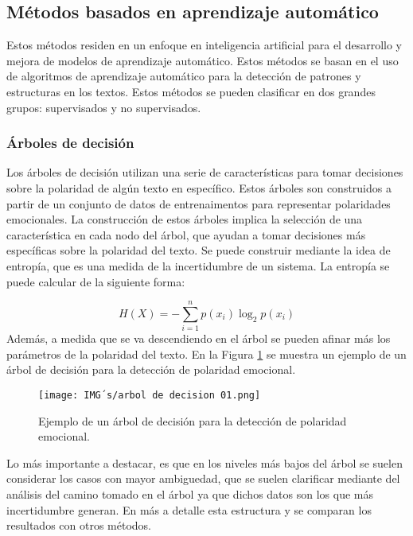 \documentclass[12pt, conference]{IEEEtran}
\begin{document}
\subsection{Métodos basados en aprendizaje automático}

Estos métodos residen en un enfoque en inteligencia artificial para el desarrollo y mejora de modelos de aprendizaje automático. Estos métodos se basan en el uso de algoritmos de aprendizaje automático para la detección de patrones y estructuras en los textos. Estos métodos se pueden clasificar en dos grandes grupos: supervisados y no supervisados.

\subsubsection{Árboles de decisión}

Los árboles de decisión utilizan una serie de características para tomar decisiones sobre la polaridad de algún texto en específico. Estos árboles son construidos a partir de un conjunto de datos de entrenaimentos para representar polaridades emocionales. La construcción de estos árboles implica la selección de una característica en cada nodo del árbol, que ayudan a tomar decisiones más específicas sobre la polaridad del texto. Se puede construir mediante la idea de entropía, que es una medida de la incertidumbre de un sistema. La entropía se puede calcular de la siguiente forma:

\begin{equation}
  H(X) = -\sum_{i=1}^{n} p(x_i) \log_2 p(x_i)
\end{equation}
Además, a medida que se va descendiendo en el árbol se pueden afinar más los parámetros de la polaridad del texto. En la Figura \ref{fig10} se muestra un ejemplo de un árbol de decisión para la detección de polaridad emocional.
\begin{figure}
  \centering
  \texttt{[image: IMG´s/arbol de decision 01.png]}
  \caption{Ejemplo de un árbol de decisión para la detección de polaridad emocional.}
  \label{fig10}
\end{figure}

Lo más importante a destacar, es que en los niveles más bajos del árbol se suelen considerar los casos con mayor ambiguedad, que se suelen clarificar mediante del análisis del camino tomado en el árbol ya que dichos datos son los que más incertidumbre generan. En \cite{f14} más a detalle esta estructura y se comparan los resultados con otros métodos.
\end{document}

